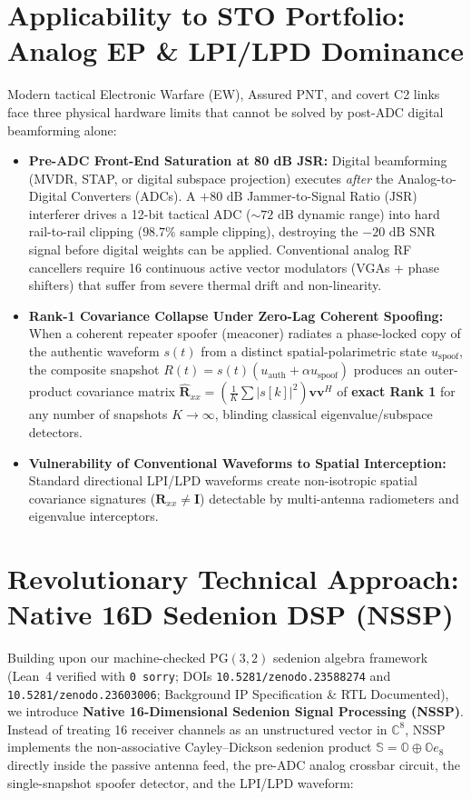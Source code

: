 \documentclass[12pt,letterpaper]{article}
\begin{document}
\section{Applicability to STO Portfolio: Analog EP \& LPI/LPD Dominance}
Modern tactical Electronic Warfare (EW), Assured PNT, and covert C2 links face three physical hardware limits that cannot be solved by post-ADC digital beamforming alone:
\begin{itemize}[leftmargin=16pt,itemsep=1pt,topsep=1pt]
    \item \textbf{Pre-ADC Front-End Saturation at 80 dB JSR:} Digital beamforming (MVDR, STAP, or digital subspace projection) executes \textit{after} the Analog-to-Digital Converters (ADCs). A $+80\text{ dB}$ Jammer-to-Signal Ratio ($\mathrm{JSR}$) interferer drives a 12-bit tactical ADC ($\sim 72\text{ dB}$ dynamic range) into hard rail-to-rail clipping ($98.7\%$ sample clipping), destroying the $-20\text{ dB}$ SNR signal before digital weights can be applied. Conventional analog RF cancellers require 16 continuous active vector modulators (VGAs + phase shifters) that suffer from severe thermal drift and non-linearity.
    \item \textbf{Rank-1 Covariance Collapse Under Zero-Lag Coherent Spoofing:} When a coherent repeater spoofer (meaconer) radiates a phase-locked copy of the authentic waveform $s(t)$ from a distinct spatial-polarimetric state $u_{\mathrm{spoof}}$, the composite snapshot $R(t) = s(t)(u_{\mathrm{auth}} + \alpha u_{\mathrm{spoof}})$ produces an outer-product covariance matrix $\hat{\mathbf{R}}_{xx} = (\frac{1}{K}\sum |s[k]|^2)\mathbf{v}\mathbf{v}^H$ of \textbf{exact Rank 1} for any number of snapshots $K \to \infty$, blinding classical eigenvalue/subspace detectors.
    \item \textbf{Vulnerability of Conventional Waveforms to Spatial Interception:} Standard directional LPI/LPD waveforms create non-isotropic spatial covariance signatures ($\mathbf{R}_{xx} \neq \mathbf{I}$) detectable by multi-antenna radiometers and eigenvalue interceptors.
\end{itemize}

\section{Revolutionary Technical Approach: Native 16D Sedenion DSP (NSSP)}
Building upon our machine-checked $\mathrm{PG}(3,2)$ sedenion algebra framework (Lean~4 verified with \texttt{0 sorry}; DOIs \texttt{10.5281/zenodo.23588274} and \texttt{10.5281/zenodo.23603006}; Background IP Specification \& RTL Documented), we introduce \textbf{Native 16-Dimensional Sedenion Signal Processing (NSSP)}. Instead of treating 16 receiver channels as an unstructured vector in $\mathbb{C}^8$, NSSP implements the non-associative Cayley--Dickson sedenion product $\mathbb{S} = \mathbb{O} \oplus \mathbb{O}e_8$ directly inside the passive antenna feed, the pre-ADC analog crossbar circuit, the single-snapshot spoofer detector, and the LPI/LPD waveform:
\end{document}
